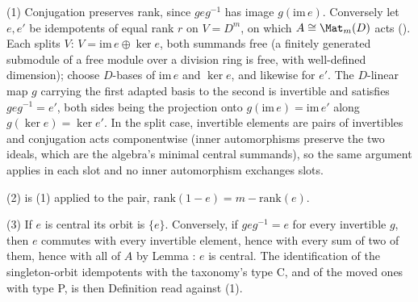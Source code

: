 (1) Conjugation preserves rank, since $geg^{-1}$ has image $g(\mathrm{im}\, e)$. Conversely let $e, e'$ be idempotents of equal rank $r$ on $V = D^m$, on which $A \cong \Mat_m(D)$ acts (). Each splits $V$: $V = \mathrm{im}\,e \oplus \ker e$, both summands free (a finitely generated submodule of a free module over a division ring is free, with well-defined dimension); choose $D$-bases of $\mathrm{im}\,e$ and $\ker e$, and likewise for $e'$. The $D$-linear map $g$ carrying the first adapted basis to the second is invertible and satisfies $g e g^{-1} = e'$, both sides being the projection onto $g(\mathrm{im}\,e) = \mathrm{im}\,e'$ along $g(\ker e) = \ker e'$. In the split case, invertible elements are pairs of invertibles and conjugation acts componentwise (inner automorphisms preserve the two ideals, which are the algebra's minimal central summands), so the same argument applies in each slot and no inner automorphism exchanges slots.

(2) is (1) applied to the pair, $\mathrm{rank}(1-e) = m - \mathrm{rank}(e)$.

(3) If $e$ is central its orbit is $\{e\}$. Conversely, if $geg^{-1} = e$ for every invertible $g$, then $e$ commutes with every invertible element, hence with every sum of two of them, hence with all of $A$ by Lemma : $e$ is central. The identification of the singleton-orbit idempotents with the taxonomy's type C, and of the moved ones with type P, is then Definition  read against (1).

